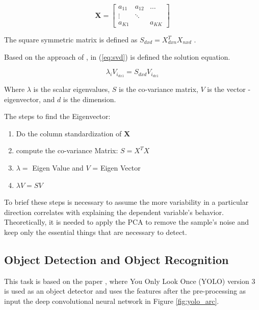 \begin{equation}\label{eq:matrix}
    \mathbf{X} = \begin{bmatrix} 
    a_{11} & a_{12} & \dots \\
    \vdots & \ddots & \\
    a_{K1} &        & a_{KK} 
    \end{bmatrix}
\end{equation}

The square symmetric matrix is defined as $S_{dxd} = X^T_{dxn}X_{nxd}$ \cite{Halko_2011}. 

Based on the approach of \cite{cambridge2009introduction}, in (\ref{eq:svd}) is defined the solution equation.

\begin{equation}
    \label{eq:svd}
    \lambda_i V_{i_{dx1}} = S_{dxd}V_{i_{dx1}}
\end{equation}

Where $\lambda$ is the scalar eigenvalues, $S$ is the co-variance matrix, $V$ is the vector - eigenvector, and $d$ is the dimension.

The steps to find the Eigenvector: 

\begin{enumerate}
    \item Do the column standardization of $\mathbf{X}$
    \item compute the co-variance Matrix: $S = X^TX$
    \item $\lambda = $ Eigen Value and $V$ = Eigen Vector
    \item $\lambda V = SV$
\end{enumerate}

To brief these steps is necessary to assume the more variability in a particular direction correlates with explaining the dependent variable's behavior. Theoretically, it is needed to apply the PCA to remove the sample's noise and keep only the essential things that are necessary to detect.


\subsection{Object Detection and Object Recognition} 

This task is based on the paper \cite{redmon2016you}, where You Only Look Once (YOLO) version 3 is used as an object detector and uses the features after the pre-processing as input the deep convolutional neural network in Figure \ref{fig:yolo_arc}.  

